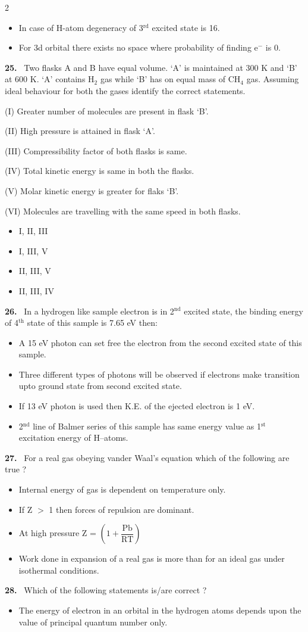 \documentclass[10pt]{extarticle}
\newcommand{\qn}[1]{\par\smallskip\noindent\textbf{#1.}~}
\newenvironment{qoptions}{\begin{itemize}[leftmargin=1.8em,itemsep=1pt,topsep=2pt,label={}]}{\end{itemize}}
\newcommand{\opt}[2]{\item[(#1)] #2}
\begin{document}
\begin{multicols}{2}
\begin{qoptions}
\opt{C}{In case of H-atom degeneracy of 3$^\mathrm{rd}$ excited state is 16.}
\opt{D}{For 3d orbital there exists no space where probability of finding e$^-$ is 0.}
\end{qoptions}
\qn{25} Two flasks A and B have equal volume. `A' is maintained at 300 K and `B' at 600 K. `A' contains H$_2$ gas while `B' has on equal mass of CH$_4$ gas. Assuming ideal behaviour for both the gases identify the correct statements.\par
(I) Greater number of molecules are present in flask `B'.\par
(II) High pressure is attained in flask `A'.\par
(III) Compressibility factor of both flasks is same.\par
(IV) Total kinetic energy is same in both the flasks.\par
(V) Molar kinetic energy is greater for flaks `B'.\par
(VI) Molecules are travelling with the same speed in both flasks.
\begin{qoptions}
\opt{A}{I, II, III}
\opt{B}{I, III, V}
\opt{C}{II, III, V}
\opt{D}{II, III, IV}
\end{qoptions}
\qn{26} In a hydrogen like sample electron is in 2$^\mathrm{nd}$ excited state, the binding energy of 4$^\mathrm{th}$ state of this sample is 7.65 eV then:
\begin{qoptions}
\opt{A}{A 15 eV photon can set free the electron from the second excited state of this sample.}
\opt{B}{Three different types of photons will be observed if electrons make transition upto ground state from second excited state.}
\opt{C}{If 13 eV photon is used then K.E. of the ejected electron is 1 eV.}
\opt{D}{2$^\mathrm{nd}$ line of Balmer series of this sample has same energy value as 1$^\mathrm{st}$ excitation energy of H--atoms.}
\end{qoptions}
\qn{27} For a real gas obeying vander Waal's equation which of the following are true ?
\begin{qoptions}
\opt{A}{Internal energy of gas is dependent on temperature only.}
\opt{B}{If Z $>$ 1 then forces of repulsion are dominant.}
\opt{C}{At high pressure Z = $\left(1+\dfrac{\mathrm{Pb}}{\mathrm{RT}}\right)$}
\opt{D}{Work done in expansion of a real gas is more than for an ideal gas under isothermal conditions.}
\end{qoptions}
\qn{28} Which of the following statements is/are correct ?
\begin{qoptions}
\opt{A}{The energy of electron in an orbital in the hydrogen atoms depends upon the value of principal quantum number only.}

\end{qoptions}
\end{multicols}
\end{document}
